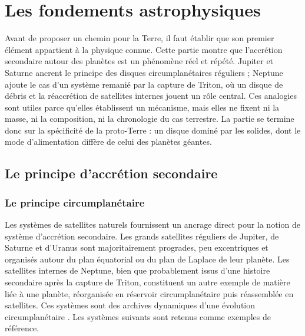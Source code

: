 \documentclass[11pt,a4paper,openany]{report}
\begin{document}
\part{Les fondements astrophysiques}
\label{part:fondements}

\noindent
Avant de proposer un chemin pour la Terre, il faut établir que son premier élément appartient à
la physique connue. Cette partie montre que l'accrétion secondaire autour des planètes est un
phénomène réel et répété. Jupiter et Saturne ancrent le principe des disques circumplanétaires
réguliers ; Neptune ajoute le cas d'un système remanié par la capture de Triton, où un disque de
débris et la réaccrétion de satellites internes jouent un rôle central. Ces analogies sont utiles
parce qu'elles établissent un mécanisme, mais elles ne fixent ni la masse, ni la composition, ni
la chronologie du cas terrestre. La partie se termine donc sur la spécificité de la proto-Terre :
un disque dominé par les solides, dont le mode d'alimentation diffère de celui des planètes
géantes.

\chapter{Le principe d'accrétion secondaire}
\label{ch:accretion-secondaire}\label{sec:satellites}

\section{Le principe circumplanétaire}

Les systèmes de satellites naturels fournissent un ancrage direct pour la notion de système
d'accrétion secondaire. Les grands satellites réguliers de Jupiter, de Saturne et d'Uranus sont
majoritairement progrades, peu excentriques et organisés autour du plan équatorial ou du plan
de Laplace de leur planète. Les satellites internes de Neptune, bien que probablement issus d'une
histoire secondaire après la capture de Triton, constituent un autre exemple de matière liée à une
planète, réorganisée en réservoir circumplanétaire puis réassemblée en satellites. Ces systèmes
sont des archives dynamiques d'une évolution circumplanétaire
\cite{CanupWard2002,CanupWard2006,Nimmo2026,Blanc2025,BanfieldMurray1992,Showalter2019,JPL}.
Les systèmes suivants sont retenus comme exemples de référence.
\end{document}
